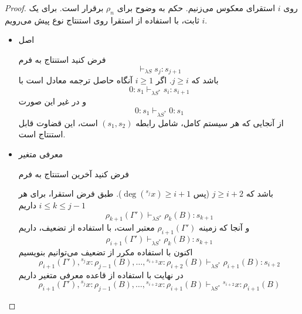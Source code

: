 \begin{proof}

روی
$i$
استقرای معکوس می‌زنیم.
حکم به وضوح برای
$\rho_n$
برقرار است.
برای یک
$i$
ثابت، با استفاده از استقرا روی استنتاج نوع پیش می‌رویم.

\begin{itemize}
    
\item اصل

فرض کنید استنتاج به فرم
\begin{equation*}
\vdash_{\lambda S} s_j : s_{j+1}
\end{equation*}
باشد که
$j \ge i$.
اگر
$i \ge 1$ آنگاه حاصل ترجمه معادل است با
\begin{equation*}
0 : s_1 \vdash_{\lambda S^*} s_i : s_{i+1}
\end{equation*}
و در غیر این صورت
\begin{equation*}
0 : s_1 \vdash_{\lambda S^*} 0 : s_1
\end{equation*}
از آنجایی که هر سیستم کامل، شامل رابطه
$(s_1, s_2)$
است، این قضاوت قابل استنتاج است.

\item معرفی متغیر

فرض کنید آخرین استنتاج به فرم
\begin{prooftree}
\end{prooftree}
باشد که
$j \ge i + 2$ (پس $\operatorname{deg}({}^{s_j}x) \ge i + 1$).
طبق فرض استقرا، برای هر
$i \le k \le j - 1$
داریم
\begin{equation*}
\rho_{k+1}(\Gamma') \vdash_{\lambda S^*} \rho_k(B) : s_{k+1}
\end{equation*}
و آنجا که زمینه
$\rho_{i+1}(\Gamma')$
معتبر است، با استفاده از تضعیف، داریم
\begin{equation*}
\rho_{i+1}(\Gamma') \vdash_{\lambda S^*} \rho_k(B) : s_{k+1}
\end{equation*}
اکنون با استفاده‌ مکرر از تضعیف می‌توانیم بنویسیم
\begin{equation*}
\rho_{i+1}(\Gamma'), {}^{s_j}x:\rho_{j-1}(B), \dots, {}^{s_{i+3}}x:\rho_{i+2}(B) \vdash_{\lambda S^*} \rho_{i+1}(B) : s_{i+2}
\end{equation*}
در نهایت با استفاده از قاعده معرفی متغیر داریم
\begin{equation*}
\rho_{i+1}(\Gamma'), {}^{s_j}x:\rho_{j-1}(B), \dots, {}^{s_{i+2}}x:\rho_{i+1}(B) \vdash_{\lambda S^*} {}^{s_{i+2}}x : \rho_{i+1}(B)
\end{equation*}


\end{itemize}
\end{proof}
